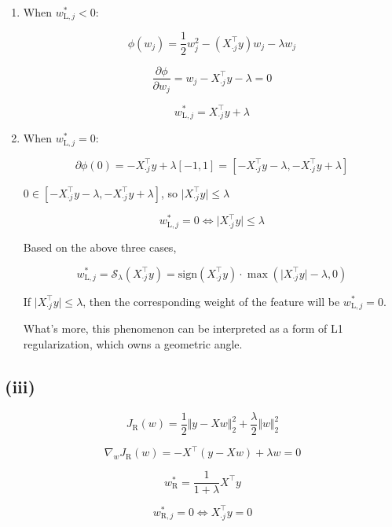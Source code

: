 \documentclass[11pt]{article}
\begin{document}
\begin{enumerate}
    $$
    w_{\text{L}, j}^* = X_{\cdot j}^\top y - \lambda
    $$

    \item[3. ]

    When $w_{\text{L}, j}^* < 0$:

    $$
    \phi(w_j) = \frac{1}{2}w_j^2 - (X_{\cdot j}^\top y) w_j - \lambda w_j
    $$

    $$
    \frac{\partial \phi}{\partial w_j} = w_j - X_{\cdot j}^\top y - \lambda = 0
    $$

    $$
    w_{\text{L}, j}^* = X_{\cdot j}^\top y + \lambda
    $$

    \item[4. ]

    When $w_{\text{L}, j}^* = 0$:

    $$
    \partial \phi(0) = -X_{\cdot j}^\top y + \lambda [-1, 1] = \left[-X_{\cdot j}^\top y - \lambda, -X_{\cdot j}^\top y + \lambda\right]
    $$

    $0 \in \left[-X_{\cdot j}^\top y - \lambda, -X_{\cdot j}^\top y + \lambda\right]$, so $\vert X_{\cdot j}^\top y \vert \le \lambda$

    $$
    w_{\text{L}, j}^* = 0 \Leftrightarrow \vert X_{\cdot j}^\top y \vert \le \lambda
    $$

    Based on the above three cases,
    
    $$
    w_{\text{L}, j}^*
    = \mathcal{S}_\lambda(X_{\cdot j}^\top y)
    = \text{sign}(X_{\cdot j}^\top y) \cdot \max\left(\vert X_{\cdot j}^\top y \vert - \lambda, 0\right)
    $$

    If $\vert X_{\cdot j}^\top y \vert \leq \lambda$, then the corresponding weight of the feature will be $w_{\text{L}, j}^* = 0$.

    What's more, this phenomenon can be interpreted as a form of L1 regularization, which owns a geometric angle.
\end{enumerate}

\subsection*{(iii)}

$$
J_{\text{R}}(w) = \frac{1}{2}\Vert y - Xw \Vert _2^2 + \frac{\lambda}{2}\Vert w \Vert _2^2
$$

$$
\nabla_w J_{\text{R}}(w) = -X^\top (y - Xw) + \lambda w = 0
$$

$$
w_{\text{R}}^* = \frac{1}{1 + \lambda} X^\top y
$$

$$
w_{\text{R}, j}^* = 0 \Leftrightarrow X_{\cdot j}^\top y = 0
$$
\end{document}
